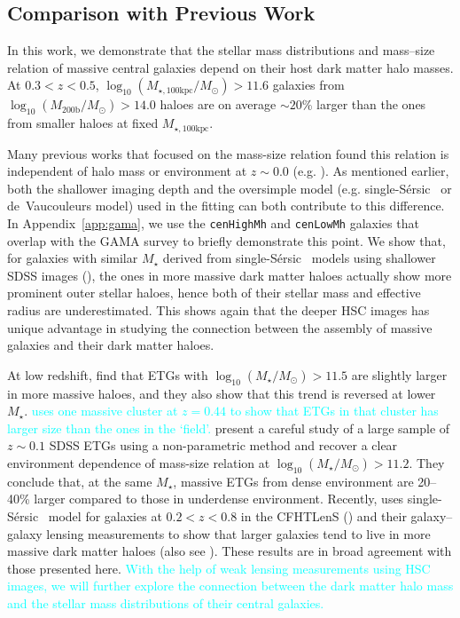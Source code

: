 \documentclass[a4paper,fleqn,usenatbib]{mnras}
\def\ser{{S\'{e}rsic\ }}
\def\rbcg{\texttt{cenHighMh}}
\def\nbcg{\texttt{cenLowMh}}
\def\mstar{{$M_{\star}$}}
\def\logms{{$\log_{10} (M_{\star}/M_{\odot})$}}
\def\logmhalo{{$\log_{10} (M_{\mathrm{200b}}/M_{\odot})$}}
\def\mtot{{$M_{\star,100\mathrm{kpc}}$}}
\def\logmtot{{$\log_{10} (M_{\star,100\mathrm{kpc}}/M_{\odot})$}}
\newcommand{\song}[1]{\textcolor{cyan}{#1}}
\begin{document}

\subsection{Comparison with Previous Work} 

    In this work, we demonstrate that the stellar mass distributions and mass--size 
    relation of massive central galaxies depend on their host dark matter halo masses. 
    At $0.3 < z < 0.5$, \logmtot{}$>11.6$ galaxies from \logmhalo{}$>14.0$ haloes 
    are on average $\sim20$\% larger than the ones from smaller haloes at fixed 
    \mtot{}.
    
    Many previous works that focused on the mass-size relation found this relation 
    is independent of halo mass or environment at $z\sim 0.0$ 
    (e.g. \citealt{Nair2010, Maltby2010, Cappellari2013, HCompany13}). 
    As mentioned earlier, both the shallower imaging depth and the oversimple model 
    (e.g. single-\ser{} or de~Vaucouleurs model) used in the fitting can both 
    contribute to this difference.
    In Appendix~\ref{app:gama}, we use the \rbcg{} and \nbcg{} galaxies that overlap 
    with the GAMA survey to briefly demonstrate this point. 
    We show that, for galaxies with similar \mstar{} derived from single-\ser{} 
    models using shallower SDSS images (\citealt{Kelvin2012}), the ones in more 
    massive dark matter haloes actually show more prominent outer stellar haloes, 
    hence both of their stellar mass and effective radius are underestimated.  
    This shows again that the deeper HSC images has unique advantage in studying 
    the connection between the assembly of massive galaxies and their dark matter 
    haloes. 
    
    At low redshift, \citet{Cerbrian2014} find that ETGs with \logms{}$>11.5$ are 
    slightly larger in more massive haloes, and they also show that this trend is 
    reversed at lower \mstar{}. 
    \song{
    \citet{Kuchner2017} uses one massive cluster at $z=0.44$ to show that ETGs in 
    that cluster has larger size than the ones in the `field'. 
    }
    \citet{Yoon2017} present a careful study of a large sample of $z\sim0.1$ SDSS ETGs 
    using a non-parametric method and recover a clear environment dependence of 
    mass-size relation at \logms{}$>11.2$. 
    They conclude that, at the same \mstar{}, massive ETGs from dense environment 
    are 20--40\% larger compared to those in underdense environment.
    Recently, \citet{Charlton2017} uses single-\ser{} model for galaxies at 
    $0.2 < z < 0.8$ in the CFHTLenS (\citealt{Heymans2012}) and their galaxy--galaxy 
    lensing measurements to show that larger galaxies tend to live in more massive 
    dark matter haloes (also see \citealt{Sonnenfeld2017}).
    These results are in broad agreement with those presented here.
    \song{
    With the help of weak lensing measurements using HSC images, we will further 
    explore the connection between the dark matter halo mass and the stellar mass 
    distributions of their central galaxies. 
    }
    
\end{document}
